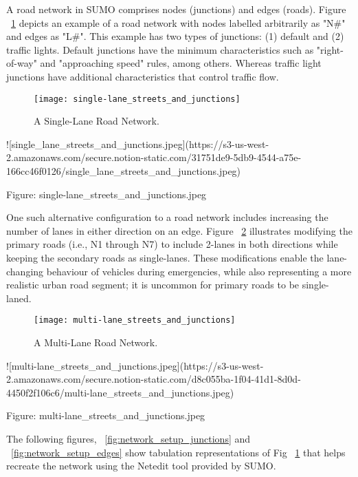A road network in SUMO comprises nodes (junctions) and edges (roads). Figure ~\ref{fig:single-lane_streets_and_junctions} depicts an example of a road network with nodes labelled arbitrarily as "N#" and edges as "L#". This example has two types of junctions: (1) default and (2) traffic lights. Default junctions have the minimum characteristics such as "right-of-way" and "approaching speed" rules, among others. Whereas traffic light junctions have additional characteristics that control traffic flow.

\begin{figure}
\texttt{[image: single-lane\_streets\_and\_junctions]}
\caption{A Single-Lane Road Network.}
\label{fig:single-lane_streets_and_junctions}
\end{figure}

![single_lane_streets_and_junctions.jpeg](https://s3-us-west-2.amazonaws.com/secure.notion-static.com/31751de9-5db9-4544-a75e-166cc46f0126/single_lane_streets_and_junctions.jpeg)

Figure: single-lane_streets_and_junctions.jpeg

One such alternative configuration to a road network includes increasing the number of lanes in either direction on an edge. Figure ~\ref{fig:multi-lane_streets_and_junctions} illustrates modifying the primary roads (i.e., N1 through N7) to include 2-lanes in both directions while keeping the secondary roads as single-lanes. These modifications enable the lane-changing behaviour of vehicles during emergencies, while also representing a more realistic urban road segment; it is uncommon for primary roads to be single-laned. 

\begin{figure}
\texttt{[image: multi-lane\_streets\_and\_junctions]}
\caption{A Multi-Lane Road Network.}
\label{fig:multi-lane_streets_and_junctions}
\end{figure}

![multi-lane_streets_and_junctions.jpeg](https://s3-us-west-2.amazonaws.com/secure.notion-static.com/d8c055ba-1f04-41d1-8d0d-4450f2f106c6/multi-lane_streets_and_junctions.jpeg)

Figure: multi-lane_streets_and_junctions.jpeg

The following figures, ~\ref{fig:network_setup_junctions} and ~\ref{fig:network_setup_edges} show tabulation representations of Fig ~\ref{fig:single-lane_streets_and_junctions} that helps recreate the network using the Netedit tool provided by SUMO. 

